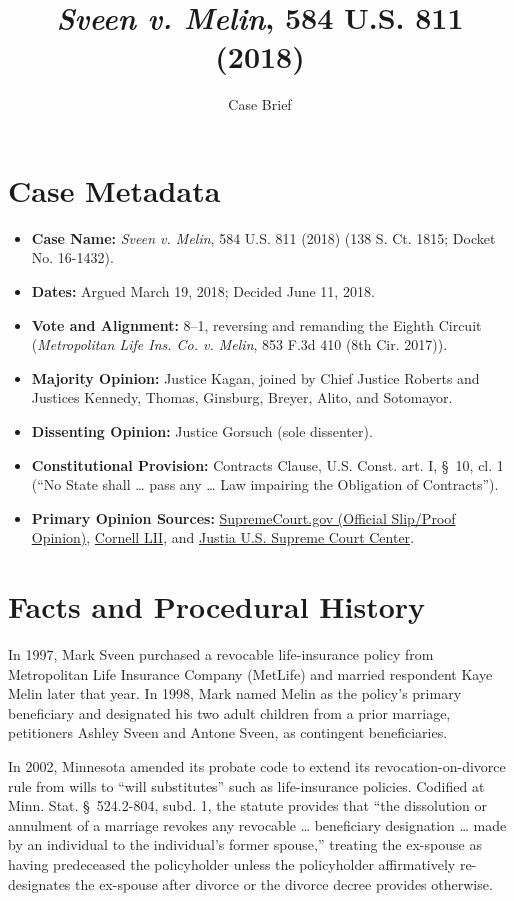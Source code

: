 \documentclass[12pt]{article}
\title{\textit{Sveen v. Melin}, 584 U.S. 811 (2018)}
\author{Case Brief}
\date{}
\begin{document}
\maketitle

\section{Case Metadata}
\begin{itemize}
  \item \textbf{Case Name:} \textit{Sveen v. Melin}, 584 U.S. 811 (2018) (138 S. Ct. 1815; Docket No. 16-1432).
  \item \textbf{Dates:} Argued March 19, 2018; Decided June 11, 2018.
  \item \textbf{Vote and Alignment:} 8--1, reversing and remanding the Eighth Circuit (\textit{Metropolitan Life Ins. Co. v. Melin}, 853 F.3d 410 (8th Cir. 2017)).
  \item \textbf{Majority Opinion:} Justice Kagan, joined by Chief Justice Roberts and Justices Kennedy, Thomas, Ginsburg, Breyer, Alito, and Sotomayor.
  \item \textbf{Dissenting Opinion:} Justice Gorsuch (sole dissenter).
  \item \textbf{Constitutional Provision:} Contracts Clause, U.S. Const. art. I, \S~10, cl. 1 (``No State shall \ldots{} pass any \ldots{} Law impairing the Obligation of Contracts'').
  \item \textbf{Primary Opinion Sources:} \href{https://www.supremecourt.gov/opinions/17pdf/584us2r49_74h3.pdf}{SupremeCourt.gov (Official Slip/Proof Opinion)}, \href{https://www.law.cornell.edu/supremecourt/text/16-1432}{Cornell LII}, and \href{https://supreme.justia.com/cases/federal/us/584/16-1432/}{Justia U.S. Supreme Court Center}.
\end{itemize}

\section{Facts and Procedural History}
In 1997, Mark Sveen purchased a revocable life-insurance policy from Metropolitan Life Insurance Company (MetLife) and married respondent Kaye Melin later that year. In 1998, Mark named Melin as the policy's primary beneficiary and designated his two adult children from a prior marriage, petitioners Ashley Sveen and Antone Sveen, as contingent beneficiaries.

In 2002, Minnesota amended its probate code to extend its revocation-on-divorce rule from wills to ``will substitutes'' such as life-insurance policies. Codified at Minn. Stat. \S~524.2-804, subd. 1, the statute provides that ``the dissolution or annulment of a marriage revokes any revocable \ldots{} beneficiary designation \ldots{} made by an individual to the individual's former spouse,'' treating the ex-spouse as having predeceased the policyholder unless the policyholder affirmatively re-designates the ex-spouse after divorce or the divorce decree provides otherwise.
\end{document}
